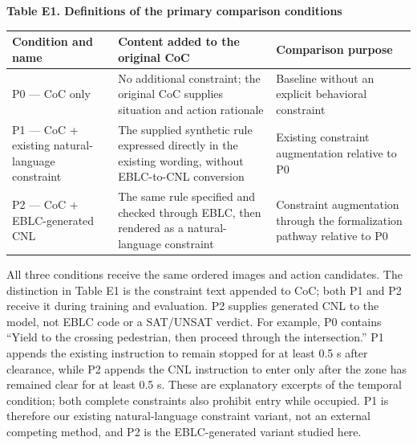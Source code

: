 \documentclass[11pt,a4paper]{article}
\begin{document}
\par\medskip\noindent\begin{minipage}{\linewidth}
\textbf{Table E1. Definitions of the primary comparison conditions}\par

\par\medskip\noindent\begin{minipage}{\linewidth}\small
\begin{tabular}{@{}>{\raggedright\arraybackslash}p{}>{\raggedright\arraybackslash}p{}>{\raggedright\arraybackslash}p{}@{}}
\toprule
\textbf{Condition and name} & \textbf{Content added to the original CoC} & \textbf{Comparison purpose} \\
\midrule
P0 — CoC only & No additional constraint; the original CoC supplies situation and action rationale & Baseline without an explicit behavioral constraint \\
P1 — CoC + existing natural-language constraint & The supplied synthetic rule expressed directly in the existing wording, without EBLC-to-CNL conversion & Existing constraint augmentation relative to P0 \\
P2 — CoC + EBLC-generated CNL & The same rule specified and checked through EBLC, then rendered as a natural-language constraint & Constraint augmentation through the formalization pathway relative to P0 \\
\bottomrule\end{tabular}\end{minipage}\par\medskip
\end{minipage}\par\medskip

All three conditions receive the same ordered images and action candidates. The distinction in Table E1 is the constraint text appended to CoC; both P1 and P2 receive it during training and evaluation. P2 supplies generated CNL to the model, not EBLC code or a SAT/UNSAT verdict. For example, P0 contains “Yield to the crossing pedestrian, then proceed through the intersection.” P1 appends the existing instruction to remain stopped for at least 0.5 s after clearance, while P2 appends the CNL instruction to enter only after the zone has remained clear for at least 0.5 s. These are explanatory excerpts of the temporal condition; both complete constraints also prohibit entry while occupied. P1 is therefore our existing natural-language constraint variant, not an external competing method, and P2 is the EBLC-generated variant studied here.\par
\end{document}
